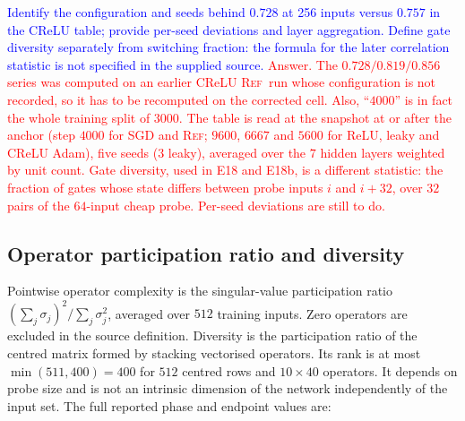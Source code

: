 \documentclass{article}
\newcommand{\zied}[1]{\textcolor{blue}{#1}}
\newcommand{\nat}[1]{\textcolor{red}{#1}}
\newcommand{\TOU}{\textsc{Ref}}
\theoremstyle{definition}
\theoremstyle{remark}
\begin{document}
\zied{Identify the configuration and seeds behind $0.728$ at 256 inputs versus $0.757$ in the CReLU table; provide per-seed deviations and layer aggregation. Define gate diversity separately from switching fraction: the formula for the later correlation statistic is not specified in the supplied source.}
\nat{Answer. The $0.728/0.819/0.856$ series was computed on an earlier CReLU \TOU\ run whose configuration is not recorded, so it has to be recomputed on the corrected cell. Also, ``$4000$'' is in fact the whole training split of $3000$. The table is read at the snapshot at or after the anchor (step $4000$ for SGD and \TOU; $9600$, $6667$ and $5600$ for ReLU, leaky and CReLU Adam), five seeds ($3$ leaky), averaged over the $7$ hidden layers weighted by unit count. Gate diversity, used in E18 and E18b, is a different statistic: the fraction of gates whose state differs between probe inputs $i$ and $i+32$, over $32$ pairs of the $64$-input cheap probe. Per-seed deviations are still to do.}

\subsection{Operator participation ratio and diversity}\label{app:e9}

Pointwise operator complexity is the singular-value participation ratio $(\sum_j\sigma_j)^2/\sum_j\sigma_j^2$, averaged over $512$ training inputs. Zero operators are excluded in the source definition. Diversity is the participation ratio of the centred matrix formed by stacking vectorised operators. Its rank is at most $\min(511,400)=400$ for $512$ centred rows and $10\times40$ operators. It depends on probe size and is not an intrinsic dimension of the network independently of the input set. The full reported phase and endpoint values are:
\end{document}
